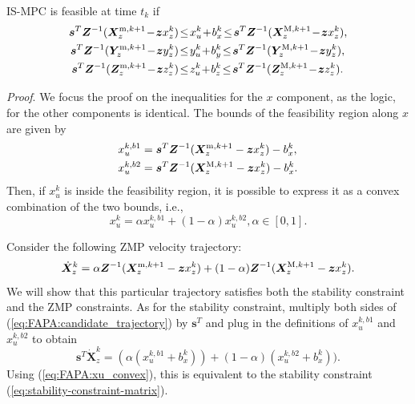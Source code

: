\begin{proposition}
\label{prop:feasibility}
IS-MPC is feasible at time $t_k$ if
\begin{align}
\label{eq:FAPA:mpc-feasibility-constraint}
\bm{s}^T \bm{Z}^{-1} (\bm{X}_z^{{\rm m}, k+1} \!-\! \bm{z} x_z^k)  \!&\le\! x_u^k \!+\! b_x^k \!\le\! \bm{s}^T \bm{Z}^{-1} (\bm{X}_z^{{\rm M}, k+1} \!-\! \bm{z} x_z^k),
\nonumber\\
\bm{s}^T \bm{Z}^{-1} (\bm{Y}_z^{{\rm m}, k+1} \!-\! \bm{z} y_z^k)  \!&\le\! y_u^k \!+\! b_y^k \!\le\! \bm{s}^T \bm{Z}^{-1} (\bm{Y}_z^{{\rm M}, k+1} \!-\! \bm{z} y_z^k),
\nonumber\\
\bm{s}^T \bm{Z}^{-1} (\bm{Z}_z^{{\rm m}, k+1} \!-\! \bm{z} z_z^k)  \!&\le\! z_u^k \!+\! b_z^k \!\le\! \bm{s}^T \bm{Z}^{-1} (\bm{Z}_z^{{\rm M}, k+1} \!-\! \bm{z} z_z^k).
\end{align}
\end{proposition}
{\em Proof}.
We focus the proof on the inequalities for the $x$ component, as the logic, for
the other components is identical. The bounds of the feasibility region along
$x$ are given by
\begin{align*}
x_u^{k,b1} &= \bm{s}^T \bm{Z}^{-1} (\bm{X}_z^{{\rm m}, k+1} - \bm{z} x_z^k) - b_x^k, \\
x_u^{k,b2} &= \bm{s}^T \bm{Z}^{-1} (\bm{X}_z^{{\rm M}, k+1} - \bm{z} x_z^k) - b_x^k.
\end{align*}
Then, if $x_u^k$ is inside the feasibility region, it is possible to express
it as a convex combination of the two bounds, i.e.,
\begin{equation}\label{eq:FAPA:xu_convex}
x_u^k = \alpha x_u^{k,b1} + (1-\alpha)x_u^{k,b2}, \alpha \in [0, 1].
\end{equation}

Consider the following ZMP velocity trajectory:
\begin{equation}\label{eq:FAPA:candidate_trajectory}
\dot{\bm{X}}_z^k = \alpha \bm{Z}^{-1}(\bm{X}_z^{{\rm m}, k+1} - \bm{z} x_z^k) + (1-\alpha)\bm{Z}^{-1}(\bm{X}_z^{{\rm M}, k+1} - \bm{z} x_z^k).
\end{equation}
We will show that this particular trajectory satisfies both the stability
constraint and the ZMP constraints. As for the stability constraint, multiply
both sides of (\ref{eq:FAPA:candidate_trajectory}) by $\bm{s}^T$
and plug in the definitions of $x_u^{k,b1}$ and $x_u^{k,b2}$ to obtain
\begin{equation*}
\bm{s}^T\dot{\bm X}_z^k = (\alpha (x_u^{k,b1} + b^k_x)) + (1-\alpha)(x_u^{k,b2} + b^k_x)).
\end{equation*}
Using (\ref{eq:FAPA:xu_convex}), this is equivalent to the stability
constraint (\ref{eq:stability-constraint-matrix}).

